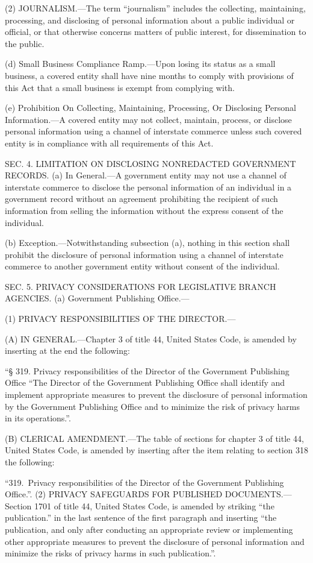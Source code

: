 (2) JOURNALISM.—The term “journalism” includes the collecting, maintaining, processing, and disclosing of personal information about a public individual or official, or that otherwise concerns matters of public interest, for dissemination to the public.

(d) Small Business Compliance Ramp.—Upon losing its status as a small business, a covered entity shall have nine months to comply with provisions of this Act that a small business is exempt from complying with.

(e) Prohibition On Collecting, Maintaining, Processing, Or Disclosing Personal Information.—A covered entity may not collect, maintain, process, or disclose personal information using a channel of interstate commerce unless such covered entity is in compliance with all requirements of this Act.


SEC. 4. LIMITATION ON DISCLOSING NONREDACTED GOVERNMENT RECORDS.
(a) In General.—A government entity may not use a channel of interstate commerce to disclose the personal information of an individual in a government record without an agreement prohibiting the recipient of such information from selling the information without the express consent of the individual.

(b) Exception.—Notwithstanding subsection (a), nothing in this section shall prohibit the disclosure of personal information using a channel of interstate commerce to another government entity without consent of the individual.


SEC. 5. PRIVACY CONSIDERATIONS FOR LEGISLATIVE BRANCH AGENCIES.
(a) Government Publishing Office.—

(1) PRIVACY RESPONSIBILITIES OF THE DIRECTOR.—

(A) IN GENERAL.—Chapter 3 of title 44, United States Code, is amended by inserting at the end the following:


“§ 319. Privacy responsibilities of the Director of the Government Publishing Office
“The Director of the Government Publishing Office shall identify and implement appropriate measures to prevent the disclosure of personal information by the Government Publishing Office and to minimize the risk of privacy harms in its operations.”.

(B) CLERICAL AMENDMENT.—The table of sections for chapter 3 of title 44, United States Code, is amended by inserting after the item relating to section 318 the following:


“319. Privacy responsibilities of the Director of the Government Publishing Office.”.
(2) PRIVACY SAFEGUARDS FOR PUBLISHED DOCUMENTS.—Section 1701 of title 44, United States Code, is amended by striking “the publication.” in the last sentence of the first paragraph and inserting “the publication, and only after conducting an appropriate review or implementing other appropriate measures to prevent the disclosure of personal information and minimize the risks of privacy harms in such publication.”.

